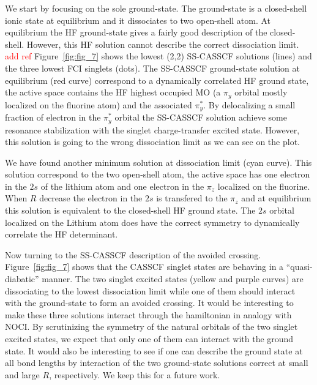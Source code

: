 \documentclass[aps,prb,reprint,showkeys,superscriptaddress]{revtex4-1}
\newcommand{\todo}[1]{\textcolor{red}{#1}}
\begin{document}
We start by focusing on the sole ground-state.
The ground-state is a closed-shell ionic state at equilibrium and it dissociates to two open-shell atom.
At equilibrium the HF ground-state gives a fairly good description of the closed-shell.
However, this HF solution cannot describe the correct dissociation limit. \todo{add ref}
Figure~\ref{fig:fig_7} shows the lowest (2,2) SS-CASSCF solutions (lines) and the three lowest FCI singlets (dots).
The SS-CASSCF ground-state solution at equilibrium (red curve) correspond to a dynamically correlated HF ground state, \ie the active space contains the HF highest occupied MO (a $\pi_y$ orbital mostly localized on the fluorine atom) and the associated $\pi_y^*$.
By delocalizing a small fraction of electron in the $\pi_y^*$ orbital the SS-CASSCF solution achieve some resonance stabilization with the singlet charge-transfer excited state.
However, this solution is going to the wrong dissociation limit as we can see on the plot.

We have found another minimum solution at dissociation limit (cyan curve).
This solution correspond to the two open-shell atom, the active space has one electron in the $2s$ of the lithium atom and one electron in the $\pi_z$ localized on the fluorine.
When $R$ decrease the electron in the $2s$ is transfered to the $\pi_z$ and at equilibrium this solution is equivalent to the closed-shell HF ground state.
The $2s$ orbital localized on the Lithium atom does have the correct symmetry to dynamically correlate the HF determinant.

Now turning to the SS-CASSCF description of the avoided crossing.
Figure~\ref{fig:fig_7} shows that the CASSCF singlet states are behaving in a ``quasi-diabatic'' manner. The two singlet excited states (yellow and purple curves) are dissociating to the lowest dissociation limit while one of them should interact with the ground-state to form an avoided crossing.
It would be interesting to make these three solutions interact through the hamiltonian in analogy with NOCI.
By scrutinizing the symmetry of the natural orbitals of the two singlet excited states, we expect that only one of them can interact with the ground state.
It would also be interesting to see if one can describe the ground state at all bond lengths by interaction of the two ground-state solutions correct at small and large $R$, respectively.
We keep this for a future work.
\end{document}
